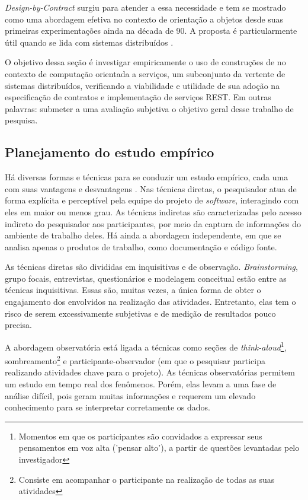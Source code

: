 \textit{Design-by-Contract} surgiu para atender a essa necessidade e tem se
mostrado como uma abordagem efetiva no contexto de orientação a objetos desde
suas primeiras experimentações \cite{jazequel1997design} ainda na década de
90. A proposta é particularmente útil quando se lida com sistemas distribuídos
\cite{arnout2001net}. 

O objetivo dessa seção é investigar empiricamente o uso de construções de
\designbycontract{} no contexto de computação orientada a serviços, um
subconjunto da vertente de sistemas distribuídos, verificando a viabilidade e
utilidade de sua adoção na especificação de contratos e implementação de
serviços REST. Em outras palavras: submeter a uma avaliação subjetiva o objetivo
geral desse trabalho de pesquisa.

\subsection{Planejamento do estudo empírico}

Há diversas formas e técnicas para se conduzir um estudo empírico, cada uma com
suas vantagens e desvantagens \cite{shull2008guide}. Nas técnicas diretas, o pesquisador
atua de forma explícita e perceptível pela equipe do projeto de \textit{software}, interagindo
com eles em maior ou menos grau. As técnicas indiretas são caracterizadas pelo
acesso indireto do pesquisador aos participantes, por meio da captura de
informações do ambiente de trabalho deles. Há ainda a abordagem independente,
em que se analisa apenas o produtos de trabalho, como documentação e código
fonte.

As técnicas diretas são divididas em inquisitivas e de observação.
\textit{Brainstorming}, grupo focais, entrevistas, questionários e modelagem
conceitual estão entre as técnicas inquisitivas. Essas são, muitas vezes, a
única forma de obter o engajamento dos envolvidos na realização das atividades.
Entretanto, elas tem o risco de serem excessivamente subjetivas e de medição de
resultados pouco precisa.

A abordagem observatória está ligada a técnicas como seções de
\textit{think-aloud}\footnote{Momentos em que os participantes são
convidados a expressar seus pensamentos em voz alta ('pensar alto'), a partir de
questões levantadas pelo investigador}, sombreamento\footnote{Consiste
em acompanhar o participante na realização de todas as suas atividades} e
participante-observador (em que o pesquisar participa realizando 
atividades chave para o projeto).
As técnicas observatórias permitem um estudo em tempo real dos fenômenos. Porém, elas levam a uma fase de análise
difícil, pois geram muitas informações e requerem um elevado conhecimento para
se interpretar corretamente os dados.

